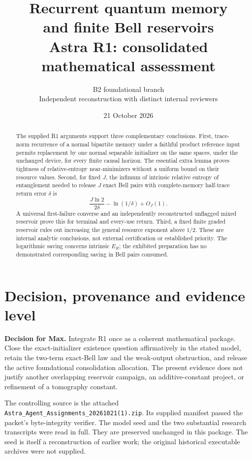 \documentclass[11pt,a4paper]{article}
\title{\textbf{Recurrent quantum memory\\and finite Bell reservoirs}\\[7pt]
\large Astra R1: consolidated mathematical assessment}
\author{B2 foundational branch\\
\small Independent reconstruction with distinct internal reviewers}
\date{21 October 2026}
\numberwithin{equation}{section}
\theoremstyle{remark}
\newcommand{\ER}{E_R}
\begin{document}
\maketitle
\begin{abstract}
The supplied R1 arguments support three complementary conclusions. First,
trace-norm recurrence of a normal bipartite memory under a faithful product
reference input permits replacement by one normal separable initializer on
the same spaces, under the unchanged device, for every finite causal horizon.
The essential extra lemma proves tightness of relative-entropy
near-minimizers without a uniform bound on their resource values. Second,
for fixed \(J\), the infimum of intrinsic relative entropy of entanglement
needed to release \(J\) exact Bell pairs with complete-memory half-trace
return error \(\delta\) is
\[
 \frac{J\ln2}{2\delta}-\ln(1/\delta)+O_J(1).
\]
A universal first-failure converse and an independently reconstructed
unflagged mixed reservoir prove this for terminal and every-use return.
Third, a fixed finite graded reservoir rules out increasing the general
resource exponent above \(1/2\). These are internal analytic conclusions,
not external certification or established priority. The logarithmic saving
concerns intrinsic \(\ER\); the exhibited preparation has no demonstrated
corresponding saving in Bell pairs consumed.
\end{abstract}

\section{Decision, provenance and evidence level}
\textbf{Decision for Max.} Integrate R1 once as a coherent mathematical
package. Close the exact-initializer existence question affirmatively in
the stated model, retain the two-term exact-Bell law and the weak-output
obstruction, and release the active foundational consolidation allocation.
The present evidence does not justify another overlapping reservoir campaign,
an additive-constant project, or refinement of a tomography constant.

The controlling source is the attached
\texttt{Astra\_Agent\_Assignments\_20261021(1).zip}. Its supplied manifest
passed the packet's byte-integrity verifier. The model seed and the two
substantial research transcripts were read in full. They are preserved
unchanged in this package. The seed is itself a reconstruction of earlier
work; the original historical executable archives were not supplied.
\end{document}
